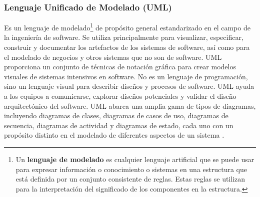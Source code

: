 \subsubsection{Lenguaje Unificado de Modelado (UML)}
Es un lenguaje de modelado\footnote{Un \textbf{lenguaje de modelado} es cualquier lenguaje artificial que se puede usar para expresar información o conocimiento o sistemas en una estructura que está definida por un conjunto consistente de reglas.
Estas reglas se utilizan para la interpretación del significado de los componentes en la estructura.} de propósito general estandarizado en el campo de la ingeniería de software.
Se utiliza principalmente para visualizar, especificar, construir y documentar los artefactos de los sistemas de software, así como para el modelado de negocios y otros sistemas que no son de software.
UML proporciona un conjunto de técnicas de notación gráfica para crear modelos visuales de sistemas intensivos en software.
No es un lenguaje de programación, sino un lenguaje visual para describir diseños y procesos de software.
UML ayuda a los equipos a comunicarse, explorar diseños potenciales y validar el diseño arquitectónico del software.
UML abarca una amplia gama de tipos de diagramas, incluyendo diagramas de clases, diagramas de casos de uso, diagramas de secuencia, diagramas de actividad y diagramas de estado, cada uno con un propósito distinto en el modelado de diferentes aspectos de un sistema \cite{OMG2017, Fowler2003}.
